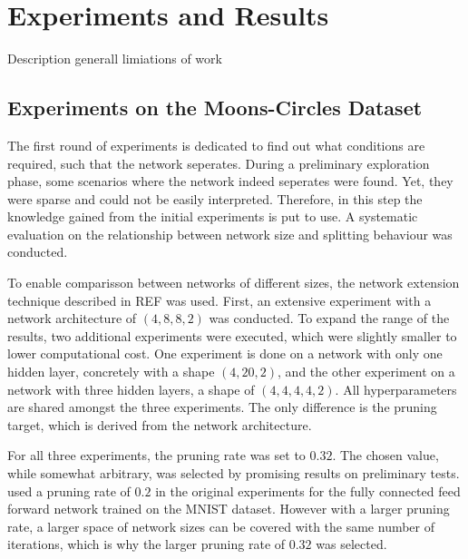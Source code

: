 \chapter{Experiments and Results}
Description generall
limiations of work

\section{Experiments on the Moons-Circles Dataset}
The first round of experiments is dedicated to find out what conditions are required, such that the network seperates.
During a preliminary exploration phase, some scenarios where the network indeed seperates were found.
Yet, they were sparse and could not be easily interpreted.
Therefore, in this step the knowledge gained from the initial experiments is put to use.
A systematic evaluation on the relationship between network size and splitting behaviour was conducted.

To enable comparisson between networks of different sizes, the network extension technique described in REF was used.
First, an extensive experiment with a network architecture of $(4,8,8,2)$ was conducted.
To expand the range of the results, two additional experiments were executed, which were slightly smaller to lower computational cost.
One experiment is done on a network with only one hidden layer, concretely with a shape $(4,20,2)$, and the other experiment on a network with three hidden layers, a shape of $(4,4,4,4,2)$.
All hyperparameters are shared amongst the three experiments.
The only difference is the pruning target, which is derived from the network architecture.

For all three experiments, the pruning rate was set to $0.32$.
The chosen value, while somewhat arbitrary, was selected by promising results on preliminary tests.
\textcite{DBLP:conf/iclr/FrankleC19} used a pruning rate of $0.2$ in the original experiments for the fully connected feed forward network trained on the MNIST dataset.
However with a larger pruning rate, a larger space of network sizes can be covered with the same number of iterations, which is why the larger pruning rate of $0.32$ was selected.

